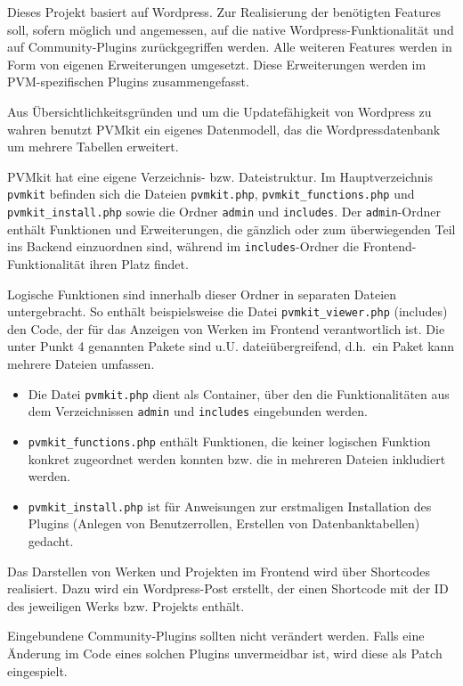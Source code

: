 \documentclass[a4paper,11pt]{article}
\begin{document}
Dieses Projekt basiert auf Wordpress. Zur Realisierung der benötigten Features
soll, sofern möglich und angemessen, auf die native Wordpress-Funktionalität
und auf Community-Plugins zurückgegriffen werden. Alle weiteren Features
werden in Form von eigenen Erweiterungen umgesetzt. Diese Erweiterungen werden
im PVM-spezifischen Plugins zusammengefasst.
 
Aus Übersichtlichkeitsgründen und um die Updatefähigkeit von Wordpress zu
wahren benutzt PVMkit ein eigenes Datenmodell, das die Wordpressdatenbank um
mehrere Tabellen erweitert.
 
PVMkit hat eine eigene Verzeichnis- bzw. Dateistruktur. Im Hauptverzeichnis
\texttt{pvmkit} befinden sich die Dateien \texttt{pvmkit.php},
\texttt{pvmkit\_functions.php} und \texttt{pvmkit\_install.php} sowie die
Ordner \texttt{admin} und \texttt{includes}. Der \texttt{admin}-Ordner enthält
Funktionen und Erweiterungen, die gänzlich oder zum überwiegenden Teil ins
Backend einzuordnen sind, während im \texttt{includes}-Ordner die
Frontend-Funktionalität ihren Platz findet.
 
Logische Funktionen sind innerhalb dieser Ordner in separaten Dateien
untergebracht. So enthält beispielsweise die Datei \texttt{pvmkit\_viewer.php}
(includes) den Code, der für das Anzeigen von Werken im Frontend
verantwortlich ist. Die unter Punkt 4 genannten Pakete sind
u.U. dateiübergreifend, d.h.\ ein Paket kann mehrere Dateien umfassen.
\begin{itemize}
\item Die Datei \texttt{pvmkit.php} dient als Container, über den die
  Funktionalitäten aus dem Verzeichnissen \texttt{admin} und \texttt{includes}
  eingebunden werden.
\item \texttt{pvmkit\_functions.php} enthält Funktionen, die keiner logischen
  Funktion konkret zugeordnet werden konnten bzw. die in mehreren Dateien
  inkludiert werden.  
\item \texttt{pvmkit\_install.php} ist für Anweisungen zur erstmaligen
  Installation des Plugins (Anlegen von Benutzerrollen, Erstellen von
  Datenbanktabellen) gedacht.
\end{itemize}
Das Darstellen von Werken und Projekten im Frontend wird über Shortcodes
realisiert.  Dazu wird ein Wordpress-Post erstellt, der einen Shortcode mit
der ID des jeweiligen Werks bzw. Projekts enthält.
 
Eingebundene Community-Plugins sollten nicht verändert werden. Falls eine
Änderung im Code eines solchen Plugins unvermeidbar ist, wird diese als Patch
eingespielt.
 
\end{document}
